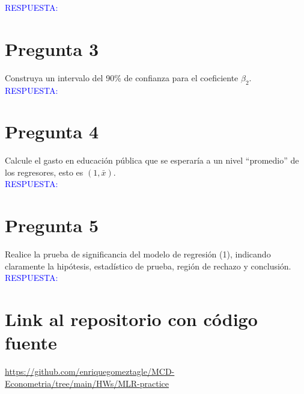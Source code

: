 \documentclass[10pt]{article}
\begin{document}
\textcolor{blue}{RESPUESTA: }
\section{Pregunta 3}
Construya un intervalo del 90\% de confianza para el coeficiente $\beta_2$. \\

\textcolor{blue}{RESPUESTA: }
\section{Pregunta 4}
Calcule el gasto en educación pública que se esperaría a un nivel “promedio” de los regresores, esto es $(1,\bar{x})$. \\

\textcolor{blue}{RESPUESTA: }
\section{Pregunta 5}
Realice la prueba de significancia del modelo de regresión (1), indicando claramente la hipótesis, estadístico de prueba, región de rechazo y conclusión. \\

\textcolor{blue}{RESPUESTA: }
\section{Link al repositorio con código fuente}
\url{https://github.com/enriquegomeztagle/MCD-Econometria/tree/main/HWs/MLR-practice}
\end{document}
